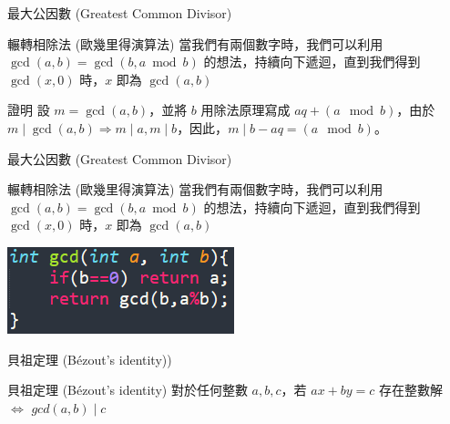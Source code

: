 \documentclass[aspectratio=169]{beamer}
\begin{document}
\begin{frame}{最大公因數 (Greatest Common Divisor)}
    \begin{alertblock}{輾轉相除法 (歐幾里得演算法)}
        當我們有兩個數字時，我們可以利用 $\gcd(a,b) = \gcd(b,a \bmod b)$ 的想法，持續向下遞迴，直到我們得到 $\gcd(x,0)$ 時，$x$ 即為 $\gcd(a,b)$
    \end{alertblock} 
    \begin{block}{證明}
        設 $m = \gcd(a,b)$，並將 $b$ 用除法原理寫成 $aq + (a\mod b)$，由於 $m \mid \gcd(a,b) \Rightarrow m \mid a, m \mid b$，因此，$m \mid b-aq = (a \mod b)$。
    \end{block}
\end{frame}

\begin{frame}{最大公因數 (Greatest Common Divisor)}
    \begin{alertblock}{輾轉相除法 (歐幾里得演算法)}
        當我們有兩個數字時，我們可以利用 $\gcd(a,b) = \gcd(b,a \bmod b)$ 的想法，持續向下遞迴，直到我們得到 $\gcd(x,0)$ 時，$x$ 即為 $\gcd(a,b)$
    \end{alertblock} 
    \begin{center}
        \includegraphics[]{images/code6.png}
    \end{center}
\end{frame}

\begin{frame}{貝祖定理 (Bézout's identity))}
    \begin{alertblock}{貝祖定理 (Bézout's identity)}
        對於任何整數 $a,b,c$，若 $ax+by = c$ 存在整數解 $\iff$ $gcd(a,b) \mid c$
    \end{alertblock} 
\end{frame}
\end{document}
